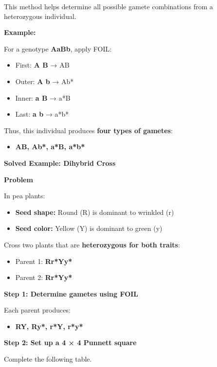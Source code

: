 \documentclass[
  letterpaper,
  DIV=11,
  numbers=noendperiod]{scrreprt}
\providecommand{\tightlist}{%
  \setlength{\itemsep}{0pt}\setlength{\parskip}{0pt}}
\begin{document}
This method helps determine all possible gamete combinations from a
heterozygous individual.

\textbf{Example:}

For a genotype \textbf{AaBb}, apply FOIL:

\begin{itemize}
\item
  First: \textbf{A B} → AB
\item
  Outer: \textbf{A b} → Ab*
\item
  Inner: \textbf{a B} → a*B
\item
  Last: \textbf{a b} → a*b*
\end{itemize}

Thus, this individual produces \textbf{four types of gametes}:

\begin{itemize}
\tightlist
\item
  \textbf{AB, Ab*, a*B, a*b*}
\end{itemize}

\textbf{Solved Example: Dihybrid Cross}

\textbf{Problem}

In pea plants:

\begin{itemize}
\item
  \textbf{Seed shape:} Round (R) is dominant to wrinkled (r)
\item
  \textbf{Seed color:} Yellow (Y) is dominant to green (y)
\end{itemize}

Cross two plants that are \textbf{heterozygous for both traits}:

\begin{itemize}
\item
  Parent 1: \textbf{Rr*Yy*}
\item
  Parent 2: \textbf{Rr*Yy*}
\end{itemize}

\textbf{Step 1: Determine gametes using FOIL}

Each parent produces:

\begin{itemize}
\tightlist
\item
  \textbf{RY, Ry*, r*Y, r*y*}
\end{itemize}

\textbf{Step 2: Set up a 4 × 4 Punnett square}

Complete the following table.
\end{document}

